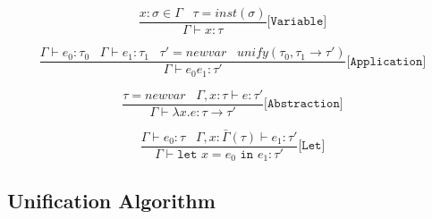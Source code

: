 \documentclass{l4proj}
\begin{document}




\begin{equation}
    \frac
    {x : \sigma \in \Gamma \;\;\; \tau = inst(\sigma)}
    {\Gamma \vdash x : \tau}
    \texttt{[Variable]}
\end{equation}

\begin{equation}
    \frac
    {\Gamma \vdash e_0 : \tau_0 \;\;\; \Gamma \vdash e_1 : \tau_1 \;\;\; \tau' = newvar \;\;\; unify(\tau_0, \tau_1 \rightarrow \tau')}
    {\Gamma \vdash e_0 e_1 : \tau'}
    \texttt{[Application]}
\end{equation}

\begin{equation}
    \frac
    {\tau = newvar \;\;\; \Gamma, x : \tau \vdash e: \tau'}
    {\Gamma \vdash \lambda x . e : \tau \rightarrow \tau'}
    \texttt{[Abstraction]}
\end{equation}

\begin{equation}
    \frac
    {\Gamma \vdash e_0 : \tau \;\;\; \Gamma, x : \bar \Gamma (\tau) \vdash e_1 : \tau '}
    {\Gamma \vdash \texttt{let } x = e_0 \texttt{ in } e_1 : \tau'}
    \texttt{[Let]}
\end{equation}
    
    
\newpage

\newpage
\subsection{Unification Algorithm}
\end{document}
